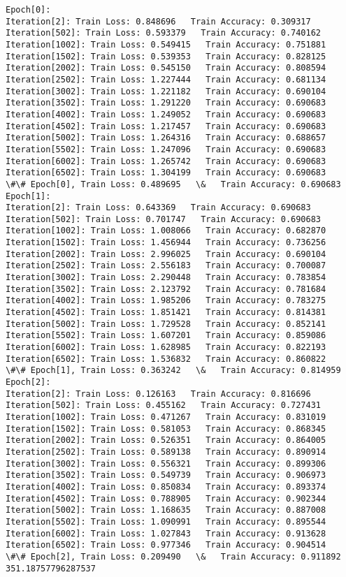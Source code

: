 \documentclass[11pt]{article}
\begin{document}
    \begin{Verbatim}[commandchars=\\\{\}]
Epoch[0]:
Iteration[2]: Train Loss: 0.848696   Train Accuracy: 0.309317 
Iteration[502]: Train Loss: 0.593379   Train Accuracy: 0.740162 
Iteration[1002]: Train Loss: 0.549415   Train Accuracy: 0.751881 
Iteration[1502]: Train Loss: 0.539353   Train Accuracy: 0.828125 
Iteration[2002]: Train Loss: 0.545150   Train Accuracy: 0.808594 
Iteration[2502]: Train Loss: 1.227444   Train Accuracy: 0.681134 
Iteration[3002]: Train Loss: 1.221182   Train Accuracy: 0.690104 
Iteration[3502]: Train Loss: 1.291220   Train Accuracy: 0.690683 
Iteration[4002]: Train Loss: 1.249052   Train Accuracy: 0.690683 
Iteration[4502]: Train Loss: 1.217457   Train Accuracy: 0.690683 
Iteration[5002]: Train Loss: 1.264316   Train Accuracy: 0.688657 
Iteration[5502]: Train Loss: 1.247096   Train Accuracy: 0.690683 
Iteration[6002]: Train Loss: 1.265742   Train Accuracy: 0.690683 
Iteration[6502]: Train Loss: 1.304199   Train Accuracy: 0.690683 
\#\# Epoch[0], Train Loss: 0.489695   \&   Train Accuracy: 0.690683
Epoch[1]:
Iteration[2]: Train Loss: 0.643369   Train Accuracy: 0.690683 
Iteration[502]: Train Loss: 0.701747   Train Accuracy: 0.690683 
Iteration[1002]: Train Loss: 1.008066   Train Accuracy: 0.682870 
Iteration[1502]: Train Loss: 1.456944   Train Accuracy: 0.736256 
Iteration[2002]: Train Loss: 2.996025   Train Accuracy: 0.690104 
Iteration[2502]: Train Loss: 2.556183   Train Accuracy: 0.700087 
Iteration[3002]: Train Loss: 2.290448   Train Accuracy: 0.783854 
Iteration[3502]: Train Loss: 2.123792   Train Accuracy: 0.781684 
Iteration[4002]: Train Loss: 1.985206   Train Accuracy: 0.783275 
Iteration[4502]: Train Loss: 1.851421   Train Accuracy: 0.814381 
Iteration[5002]: Train Loss: 1.729528   Train Accuracy: 0.852141 
Iteration[5502]: Train Loss: 1.607201   Train Accuracy: 0.859086 
Iteration[6002]: Train Loss: 1.628985   Train Accuracy: 0.822193 
Iteration[6502]: Train Loss: 1.536832   Train Accuracy: 0.860822 
\#\# Epoch[1], Train Loss: 0.363242   \&   Train Accuracy: 0.814959
Epoch[2]:
Iteration[2]: Train Loss: 0.126163   Train Accuracy: 0.816696 
Iteration[502]: Train Loss: 0.455162   Train Accuracy: 0.727431 
Iteration[1002]: Train Loss: 0.471267   Train Accuracy: 0.831019 
Iteration[1502]: Train Loss: 0.581053   Train Accuracy: 0.868345 
Iteration[2002]: Train Loss: 0.526351   Train Accuracy: 0.864005 
Iteration[2502]: Train Loss: 0.589138   Train Accuracy: 0.890914 
Iteration[3002]: Train Loss: 0.556321   Train Accuracy: 0.899306 
Iteration[3502]: Train Loss: 0.549739   Train Accuracy: 0.906973 
Iteration[4002]: Train Loss: 0.850834   Train Accuracy: 0.893374 
Iteration[4502]: Train Loss: 0.788905   Train Accuracy: 0.902344 
Iteration[5002]: Train Loss: 1.168635   Train Accuracy: 0.887008 
Iteration[5502]: Train Loss: 1.090991   Train Accuracy: 0.895544 
Iteration[6002]: Train Loss: 1.027843   Train Accuracy: 0.913628 
Iteration[6502]: Train Loss: 0.977346   Train Accuracy: 0.904514 
\#\# Epoch[2], Train Loss: 0.209490   \&   Train Accuracy: 0.911892
351.18757796287537

    \end{Verbatim}
\end{document}

